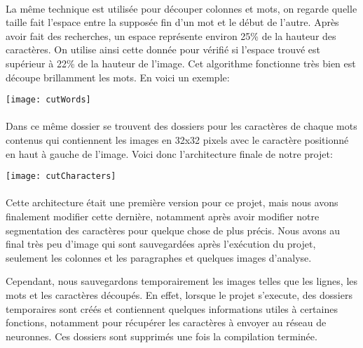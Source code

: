 \documentclass{article}
\begin{document}
	\paragraph{}
	La même technique est utilisée pour découper colonnes et mots, on regarde quelle taille fait l'espace entre la supposée fin d'un mot et le début de l'autre. Après avoir fait des recherches, un espace représente environ 25\% de la hauteur des caractères. On utilise ainsi cette donnée pour vérifié si l'espace trouvé est supérieur à 22\% de la hauteur de l'image. Cet algorithme fonctionne très bien est découpe brillamment les mots. En voici un exemple: \\
	
	\begin{center}
		\texttt{[image: cutWords]}
	\end{center}
	
	\paragraph{}Dans ce même dossier se trouvent des dossiers pour les caractères de chaque mots contenus qui contiennent les images en 32x32 pixels avec le caractère positionné en haut à gauche de l'image. Voici donc l'architecture finale de notre projet:
	
	\begin{center}
		\texttt{[image: cutCharacters]}
	\end{center}
	
    \paragraph{}Cette architecture était une première version pour ce projet, mais nous avons finalement modifier cette dernière, notamment après avoir modifier notre segmentation des caractères pour quelque chose de plus précis. Nous avons au final très peu d'image qui sont sauvegardées après l'exécution du projet, seulement les colonnes et les paragraphes et quelques images d'analyse. \\
    \par Cependant, nous sauvegardons temporairement les images telles que les lignes, les mots et les caractères découpés. En effet, lorsque le projet s'execute, des dossiers temporaires sont créés et contiennent quelques informations utiles à certaines fonctions, notamment pour récupérer les caractères à envoyer au réseau de neuronnes. Ces dossiers sont supprimés une fois la compilation terminée.
    
\end{document}
